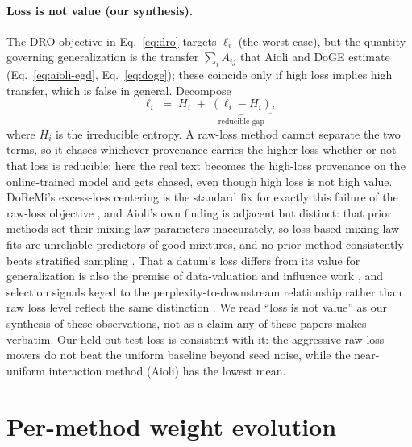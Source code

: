 \documentclass{article}
\begin{document}
\paragraph{Loss is not value (our synthesis).} The DRO objective in Eq.~\eqref{eq:dro} targets $\ell_i$ (the worst case), but the quantity governing generalization is the transfer $\sum_i A_{ij}$ that Aioli and DoGE estimate (Eq.~\eqref{eq:aioli-egd}, Eq.~\eqref{eq:doge}); these coincide only if high loss implies high transfer, which is false in general. Decompose
\begin{equation}
\ell_i \;=\; H_i \;+\; \underbrace{(\ell_i - H_i)}_{\text{reducible gap}},
\label{eq:decomp}
\end{equation}
where $H_i$ is the irreducible entropy. A raw-loss method cannot separate the two terms, so it chases whichever provenance carries the higher loss whether or not that loss is reducible; here the real text becomes the high-loss provenance on the online-trained model and gets chased, even though high loss is not high value. DoReMi's excess-loss centering is the standard fix for exactly this failure of the raw-loss objective \citep{doremi2023}, and Aioli's own finding is adjacent but distinct: that prior methods set their mixing-law parameters inaccurately, so loss-based mixing-law fits are unreliable predictors of good mixtures, and no prior method consistently beats stratified sampling \citep{aioli2024}. That a datum's loss differs from its value for generalization is also the premise of data-valuation and influence work \citep{datashapley2019, less2024}, and selection signals keyed to the perplexity-to-downstream relationship rather than raw loss level reflect the same distinction \citep{thrush2025perplexitycorr}. We read ``loss is not value'' as our synthesis of these observations, not as a claim any of these papers makes verbatim. Our held-out test loss is consistent with it: the aggressive raw-loss movers do not beat the uniform baseline beyond seed noise, while the near-uniform interaction method (Aioli) has the lowest mean.

\section{Per-method weight evolution}
\label{app:weights}
\end{document}

